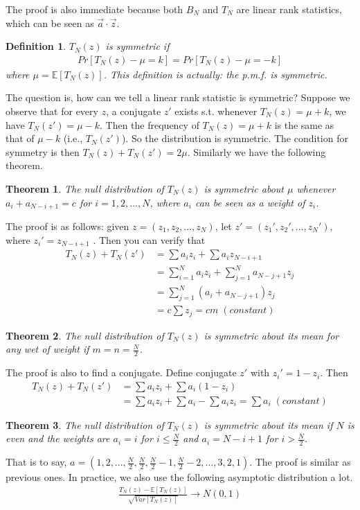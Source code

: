 \documentclass[twoside]{article}
\newtheorem*{theorem*}{Theorem}
\newtheorem*{definition*}{Definition}
\begin{document}
	The proof is also immediate because both $B_N$ and $T_N$ are linear rank statistics, which can be seen as $\vec{a} \cdot \vec{z}$.
	\begin{definition*}
		$T_N(z)$ is symmetric if 
		\begin{align*}
			Pr \left[ T_N(z) - \mu = k \right] = Pr \left[ T_N (z) - \mu = -k \right]
		\end{align*}
		where $\mu = \mathbb{E} \left[ T_N(z) \right]$. This definition is actually: the p.m.f. is symmetric. 
	\end{definition*}
	The question is, how can we tell a linear rank statistic is symmetric? Suppose we observe that for every $z$, a conjugate $z'$ exists s.t. whenever $T_N(z) = \mu + k$, we have $T_N(z') = \mu - k$. Then the frequency of $T_N(z) = \mu+k$ is the same as that of $\mu - k$ (i.e., $T_N(z')$). So the distribution is symmetric. The condition for symmetry is then $T_N(z) + T_N(z') = 2 \mu$. Similarly we have the following theorem. 
	\begin{theorem*}
		The null distribution of $T_N(z)$ is symmetric about $\mu$ whenever $a_i + a_{N-i+1} = c$ for $i = 1, 2, ..., N$, where $a_i$ can be seen as a weight of $z_i$. 
	\end{theorem*}
	The proof is as follows: given $z = (z_1, z_2, ..., z_N)$, let $z' = (z_1', z_2', ..., z_N')$, where $z_i' = z_{N-i+1}$ . Then you can verify that 
	\begin{align*}
		T_N(z) + T_N(z') &= \sum a_i z_i + \sum a_i z_{N-i+1} \\
		&= \sum_{i=1}^{N} a_i z_i + \sum_{j=1}^{N} a_{N-j+1}z_j \\
		&= \sum_{j=1}^{N} \left( a_i + a_{N-j+1} \right) z_j \\
		&= c \sum z_j = cm \; (constant)
	\end{align*}
	\begin{theorem*}
		The null distribution of $T_N(z)$ is symmetric about its mean for any wet of weight if $m=n=\frac{N}{2}$. 
	\end{theorem*}
	The proof is also to find a conjugate. Define conjugate $z'$ with $z_i' = 1 - z_i$. Then
	\begin{align*}
		T_N(z) + T_N(z') &= \sum a_i z_i + \sum a_i (1-z_i) \\
		&= \sum a_i z_i + \sum a_i - \sum a_i z_i = \sum a_i \; (constant)
	\end{align*}
	\begin{theorem*}
		The null distribution of $T_N(z)$ is symmetric about its mean if $N$ is even and the weights are $a_i = i$ for $i \leqslant \frac{N}{2}$ and $a_i = N-i+1$ for $i > \frac{N}{2}$. 
	\end{theorem*}
	That is to say, $a = (1, 2, ..., \frac{N}{2}, \frac{N}{2}, \frac{N}{2} - 1, \frac{N}{2} - 2, ..., 3, 2, 1)$. The proof is similar as previous ones. In practice, we also use the following asymptotic distribution a lot. 
	\begin{align*}
		\frac{T_N \left( z \right) - \mathbb{E} \left[ T_N(z) \right]}{\sqrt{Var \left[ T_N(z) \right]}} \to N(0,1)
	\end{align*}
\end{document}
